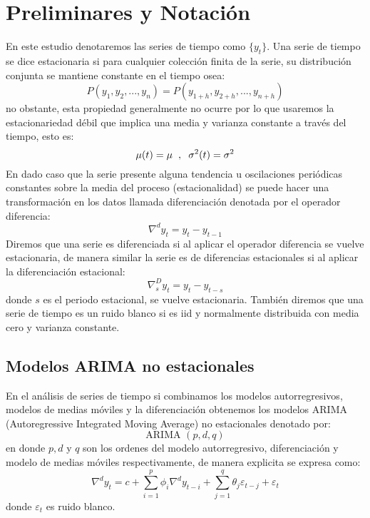 \documentclass[peerreview]{IEEEtran}
\begin{document}
\section{Preliminares y Notaci\'on}
En este estudio denotaremos las series de tiempo como $\{y_t\}$. Una serie de tiempo se dice estacionaria si para cualquier colección finita de la serie, su distribución conjunta se mantiene constante en el tiempo osea:
\begin{equation*}
P(y_1,y_2,...,y_n)=P(y_{1+h},y_{2+h},...,y_{n+h})
\end{equation*}
no obstante, esta propiedad generalmente no ocurre por lo que usaremos la estacionariedad débil que implica una media y varianza constante a través del tiempo, esto es:
\begin{equation*}
\mu(t)=\mu \hspace{0.2cm},\hspace{0.2cm} \sigma^2(t)=\sigma^2
\end{equation*}
En dado caso que la serie presente alguna tendencia u oscilaciones periódicas constantes sobre la media del proceso (estacionalidad) se puede hacer una transformación en los datos llamada diferenciación denotada por el operador diferencia:
\begin{equation*}
\nabla^dy_t=y_t-y_{t-1}
\end{equation*}
Diremos que una serie es diferenciada si al aplicar el operador diferencia se vuelve estacionaria, de manera similar la serie es de diferencias estacionales si al aplicar la diferenciación estacional:
\begin{equation*}
\nabla^D_sy_t=y_t-y_{t-s}
\end{equation*}
donde $s$ es el periodo estacional, se vuelve estacionaria.
También diremos que una serie de tiempo es un ruido blanco si es iid y normalmente distribuida con media cero y varianza constante.

\subsection{Modelos ARIMA no estacionales}
En el análisis de series de tiempo si combinamos los modelos autorregresivos, modelos de medias móviles y la diferenciación obtenemos los modelos ARIMA (Autoregressive Integrated Moving Average) no estacionales denotado por:
\begin{equation*}
\text{ARIMA  }(p,d,q) 
\end{equation*}
en donde $p,d$ y $q$ son los ordenes del modelo autorregresivo, diferenciación y modelo de medias móviles respectivamente, de manera explicita se expresa como:
\begin{equation*}
\nabla^dy_t=c+\sum_{i=1}^p\phi_i\nabla^dy_{t-i}+\sum_{j=1}^q\theta_j\varepsilon_{t-j} + \varepsilon_t
\end{equation*}
donde $\varepsilon_t$ es ruido blanco.
\end{document}
